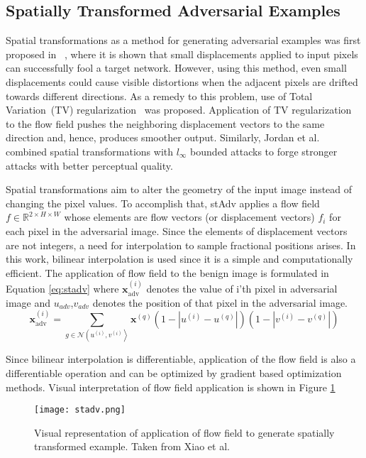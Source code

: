 \subsection{Spatially Transformed Adversarial Examples}

Spatial transformations as a method for generating adversarial examples was first proposed in ~\cite{xiao2018spatially}, where it is shown that small displacements applied to input pixels can successfully fool a target network. However, using this method, even small displacements could cause visible distortions when the adjacent pixels are drifted towards different directions. As a remedy to this problem, use of  Total Variation~(TV) regularization~\cite{estrela2016total} was proposed. Application of TV regularization to the flow field pushes the neighboring displacement vectors to the same direction and, hence, produces smoother output. Similarly, Jordan et al.~\cite{jordan2019quantifying} combined spatial transformations with \(l_\infty\) bounded attacks to forge stronger attacks with better perceptual quality.

Spatial transformations aim to alter the geometry of the input image instead of changing the pixel values. To accomplish that, stAdv applies a flow field \(f \in \mathbb{R}^{2\times H \times W}\) whose elements are flow vectors (or displacement vectors) \(f_i\) for each pixel in the adversarial image. Since the elements of displacement vectors are not integers, a need for interpolation to sample fractional positions arises. In this work, bilinear interpolation is used since it is a simple and computationally efficient. The application of flow field to the benign image is formulated in Equation \ref{eq:stadv} where \(\mathbf{x}_{\mathrm{adv}}^{(i)}\) denotes the value of i'th pixel in adversarial image and \(u_{adv}\),\(v_{adv}\) denotes the position of that pixel in the adversarial image.
\begin{equation}
    \label{eq:stadv}
    \mathbf{x}_{\mathrm{adv}}^{(i)}=\sum_{g \in \mathcal{N}\left(u^{(i)}, v^{(i)}\right\rangle} \mathbf{x}^{(q)}\left(1-\left|u^{(i)}-u^{(q)}\right|\right)\left(1-\left|v^{(i)}-v^{(q)}\right|\right)
\end{equation}

Since bilinear interpolation is differentiable, application of the flow field is also a differentiable operation and can be optimized by gradient based optimization methods. Visual interpretation of flow field application is shown in Figure \ref{fig:stadv}

\begin{figure}[h]
    \texttt{[image: stadv.png]}
    \caption{Visual representation of application of flow field to generate spatially transformed example. Taken from Xiao et al. \cite{xiao2018spatially}}\label{fig:stadv}

\end{figure}

